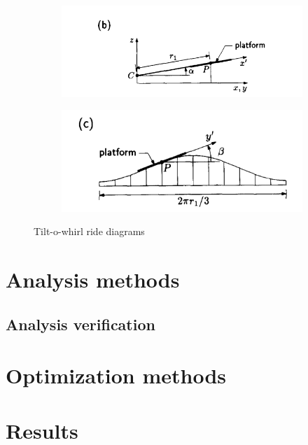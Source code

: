 \documentclass[11pt]{article}
\begin{document}
\begin{figure}[hbt!]
\begin{subfigure}{.25\textwidth}
\end{subfigure}%
\begin{subfigure}{.25\textwidth}
\centering
\includegraphics[width=.99\linewidth]{ride3}
\end{subfigure}%
\begin{subfigure}{.25\textwidth}
\centering
\includegraphics[width=.99\linewidth]{ride4}
\end{subfigure}
\caption{Tilt-o-whirl ride diagrams}
\label{fig:ride}
\end{figure}

\section{Analysis methods}

\subsection{Analysis verification}

\section{Optimization methods}

\section{Results}
\end{document}
